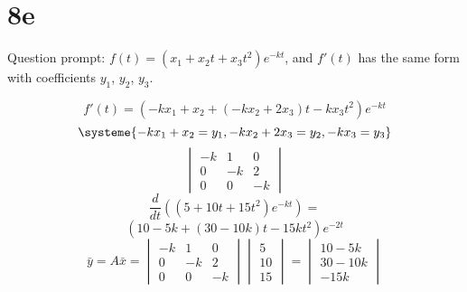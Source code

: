 \documentclass[12pt]{article}
\begin{document}
\section{8e}

Question prompt: $f(t) = (x_1 + x_2t + x_3t^2)e^{-kt}$, and $f'(t)$ has the same
form with coefficients $y_1$, $y_2$, $y_3$.

\[
  f'(t) = (-kx_1 + x_2 + (-kx_2+2x_3)t - kx_3t^2)e^{-kt}
\]
\[
  \systeme{-kx_1 + x_2 = y_1, -kx_2+2x_3 = y_2, -kx_{3} = y_3}
\]
\[
  \begin{vmatrix}
    -k & 1 & 0 \\
    0 & -k & 2 \\
    0 & 0 & -k
  \end{vmatrix}
\]
\[
  \frac{d}{dt}((5+10t+15t^2)e^{-kt}) = 
\]
\[
  (10-5k + (30-10k)t -15kt^2)e^{-2t}
\]
\medbreak{}
\[
  \bar{y} = A\bar{x} = 
  \begin{vmatrix}
    -k & 1 & 0 \\
    0 & -k & 2 \\
    0 & 0 & -k
  \end{vmatrix}
  \begin{vmatrix} 5 \\ 10 \\ 15 \end{vmatrix} = 
  \begin{vmatrix} 10-5k \\ 30-10k \\ -15k \end{vmatrix}
\]
\end{document}
